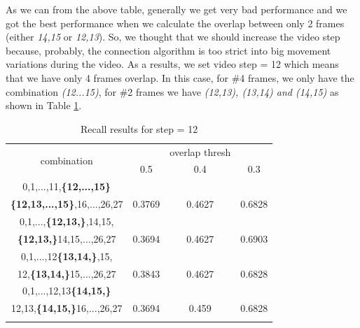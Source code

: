 \documentclass{report}
\begin{document}
As we can from the above table, generally we get very bad performance and we got the best performance when we calculate the overlap between only 2 frames (either \textit{14,15} or \textit{12,13}).
So, we thought that we should increase the video step because, probably, the connection algorithm is too strict into big movement variations during  the video. As a results, we set video step = 12 which
means that we have only 4 frames overlap. In this case,  for \#4 frames, we only have the combination \textit{(12...15)}, for \#2 frames we have \textit{(12,13), (13,14) and (14,15)} as shown in
Table \ref{table:step12_16}.

\begin{center}
\begin{longtable}{||c||c c c||}

  \hline
  \multirow{2}{5em}{combination} & {} &overlap thresh & {} \\
                                    &  0.5  &  0.4 &  0.3 \\         
  \hline  \hline
  0,1,...,11,\textbf{\{12,...,15\}}           & {} & {} & {} \\
  \textbf{\{12,13,...,15\}},16,...,26,27         & 0.3769 & 0.4627 & 0.6828 \\
  \hline     \hline                          

  0,1,...,\textbf{\{12,13,\}},14,15,          & {} & {} & {} \\
  \textbf{\{12,13,\}}14,15,...,26,27          & 0.3694   & 0.4627 & 0.6903 \\
  \hline                          
  0,1,...,12\textbf{\{13,14,\}},15,           & {} & {} & {} \\
  12,\textbf{\{13,14,\}}15,...,26,27          & 0.3843   & 0.4627 & 0.6828 \\
  \hline                          
  0,1,...,12,13\textbf{\{14,15,\}}            & {} & {} & {} \\
  12,13,\textbf{\{14,15,\}}16,...,26,27       & 0.3694   & 0.459 & 0.6828 \\
  \hline     \hline                          

  \caption{Recall results for step = 12}
  \label{table:step12_16}
\end{longtable} 
\end{center}
\end{document}
